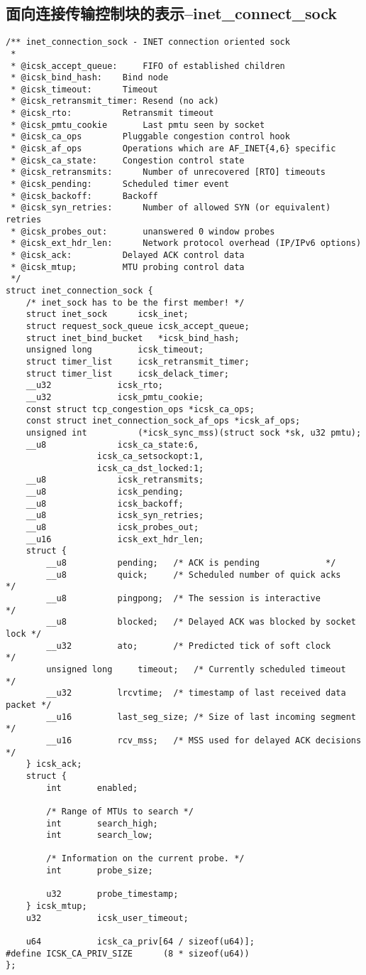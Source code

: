 \documentclass[11pt, a4paper,oneside]{book}
\theoremstyle{ocrenumbox}
\theoremstyle{purplenumbox}
\theoremstyle{blackbox}
\begin{document}
		\subsection{面向连接传输控制块的表示--inet\_connect\_sock}
\begin{verbatim}
/** inet_connection_sock - INET connection oriented sock
 *
 * @icsk_accept_queue:	   FIFO of established children 
 * @icsk_bind_hash:	   Bind node
 * @icsk_timeout:	   Timeout
 * @icsk_retransmit_timer: Resend (no ack)
 * @icsk_rto:		   Retransmit timeout
 * @icsk_pmtu_cookie	   Last pmtu seen by socket
 * @icsk_ca_ops		   Pluggable congestion control hook
 * @icsk_af_ops		   Operations which are AF_INET{4,6} specific
 * @icsk_ca_state:	   Congestion control state
 * @icsk_retransmits:	   Number of unrecovered [RTO] timeouts
 * @icsk_pending:	   Scheduled timer event
 * @icsk_backoff:	   Backoff
 * @icsk_syn_retries:      Number of allowed SYN (or equivalent) retries
 * @icsk_probes_out:	   unanswered 0 window probes
 * @icsk_ext_hdr_len:	   Network protocol overhead (IP/IPv6 options)
 * @icsk_ack:		   Delayed ACK control data
 * @icsk_mtup;		   MTU probing control data
 */
struct inet_connection_sock {
	/* inet_sock has to be the first member! */
	struct inet_sock	  icsk_inet;
	struct request_sock_queue icsk_accept_queue;
	struct inet_bind_bucket	  *icsk_bind_hash;
	unsigned long		  icsk_timeout;
 	struct timer_list	  icsk_retransmit_timer;
 	struct timer_list	  icsk_delack_timer;
	__u32			  icsk_rto;
	__u32			  icsk_pmtu_cookie;
	const struct tcp_congestion_ops *icsk_ca_ops;
	const struct inet_connection_sock_af_ops *icsk_af_ops;
	unsigned int		  (*icsk_sync_mss)(struct sock *sk, u32 pmtu);
	__u8			  icsk_ca_state:6,
				  icsk_ca_setsockopt:1,
				  icsk_ca_dst_locked:1;
	__u8			  icsk_retransmits;
	__u8			  icsk_pending;
	__u8			  icsk_backoff;
	__u8			  icsk_syn_retries;
	__u8			  icsk_probes_out;
	__u16			  icsk_ext_hdr_len;
	struct {
		__u8		  pending;	 /* ACK is pending			   */
		__u8		  quick;	 /* Scheduled number of quick acks	   */
		__u8		  pingpong;	 /* The session is interactive		   */
		__u8		  blocked;	 /* Delayed ACK was blocked by socket lock */
		__u32		  ato;		 /* Predicted tick of soft clock	   */
		unsigned long	  timeout;	 /* Currently scheduled timeout		   */
		__u32		  lrcvtime;	 /* timestamp of last received data packet */
		__u16		  last_seg_size; /* Size of last incoming segment	   */
		__u16		  rcv_mss;	 /* MSS used for delayed ACK decisions	   */ 
	} icsk_ack;
	struct {
		int		  enabled;

		/* Range of MTUs to search */
		int		  search_high;
		int		  search_low;

		/* Information on the current probe. */
		int		  probe_size;

		u32		  probe_timestamp;
	} icsk_mtup;
	u32			  icsk_user_timeout;

	u64			  icsk_ca_priv[64 / sizeof(u64)];
#define ICSK_CA_PRIV_SIZE      (8 * sizeof(u64))
};
\end{verbatim}		
\end{document}
